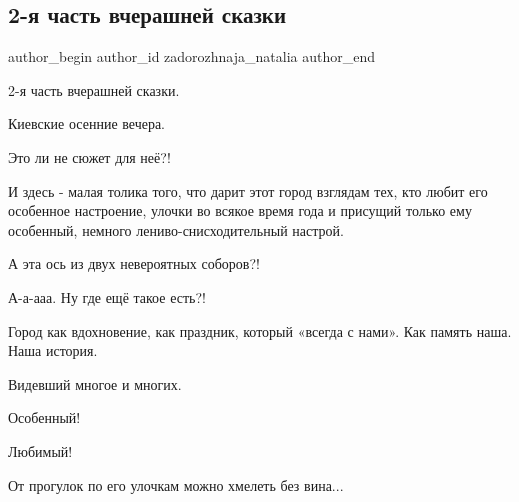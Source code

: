  
 
 
 
 
 
\subsection{2-я часть вчерашней сказки}
\label{sec:19_11_2021.fb.zadorozhnaja_natalia.2.skazka_sofia_2}
 
\ifcmt
 author_begin
   author_id zadorozhnaja_natalia
 author_end
\fi

2-я часть вчерашней сказки.

Киевские осенние вечера.

Это ли не сюжет для неё?!


И здесь - малая толика того, что дарит этот город взглядам тех, кто любит его
особенное настроение, улочки во всякое время года и присущий только ему
особенный, немного лениво-снисходительный настрой.

А эта ось из двух невероятных соборов?!

А-а-ааа. Ну где ещё такое есть?!


Город как вдохновение, как праздник, который «всегда с нами». Как память наша.
Наша история.

Видевший многое и многих. 

Особенный!

Любимый!

От прогулок по его улочкам можно хмелеть без вина...

